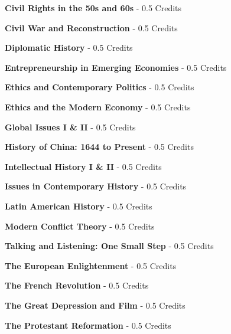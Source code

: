 \vspace{3mm}\noindent\textbf{  Civil Rights in the 50s and 60s   }  - 0.5 Credits

\vspace{3mm}\noindent\textbf{  Civil War and Reconstruction   }  - 0.5 Credits

\vspace{3mm}\noindent\textbf{  Diplomatic History   }  - 0.5 Credits

\vspace{3mm}\noindent\textbf{  Entrepreneurship in Emerging Economies   }  - 0.5 Credits

\vspace{3mm}\noindent\textbf{  Ethics and Contemporary Politics   }  - 0.5 Credits

\vspace{3mm}\noindent\textbf{  Ethics and the Modern Economy   }  - 0.5 Credits


\vspace{3mm}\noindent\textbf{  Global Issues I  \& II }  - 0.5 Credits


\vspace{3mm}\noindent\textbf{  History of China: 1644 to Present   }  - 0.5 Credits

\vspace{3mm}\noindent\textbf{  Intellectual History I \& II  }  - 0.5 Credits


\vspace{3mm}\noindent\textbf{  Issues in Contemporary History   }  - 0.5 Credits

\vspace{3mm}\noindent\textbf{  Latin American History   }  - 0.5 Credits

\vspace{3mm}\noindent\textbf{  Modern Conflict Theory   }  - 0.5 Credits

\vspace{3mm}\noindent\textbf{  Talking and Listening:  One Small Step   }  - 0.5 Credits

\vspace{3mm}\noindent\textbf{  The European Enlightenment   }  - 0.5 Credits

\vspace{3mm}\noindent\textbf{  The French Revolution   }  - 0.5 Credits

\vspace{3mm}\noindent\textbf{  The Great Depression and Film   }  - 0.5 Credits


\vspace{3mm}\noindent\textbf{  The Protestant Reformation   }  - 0.5 Credits

